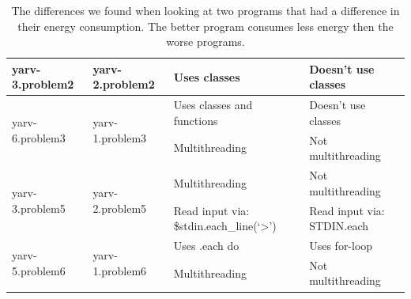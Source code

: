 \begin{appendices}
\begin{table}[h]
{\begin{tabular}{|l|l|l|l|}
yarv-3.problem2 & yarv-2.problem2 & Uses classes & Doesn't use classes \\ \hline
\multirow{2}{*}{yarv-6.problem3} & \multirow{2}{*}{yarv-1.problem3} & Uses classes and functions & Doesn't use classes \\ \cline{3-4} 
 &  & Multithreading & Not multithreading \\ \hline
\multirow{2}{*}{yarv-3.problem5} & \multirow{2}{*}{yarv-2.problem5} & Multithreading & Not multithreading \\ \cline{3-4} 
 &  & Read input via: \$stdin.each\_line(‘\textgreater{}’) & Read input via: STDIN.each \\ \hline
\multirow{2}{*}{yarv-5.problem6} & \multirow{2}{*}{yarv-1.problem6} & Uses .each do & Uses for-loop \\ \cline{3-4} 
 &  & Multithreading & Not multithreading \\ \hline
\end{tabular}%
}
\caption{The differences we found when looking at two programs that had a difference in their energy consumption. The better program consumes less energy then the worse programs.}
\label{tab:code-level}
\end{table}


% 








\end{appendices}